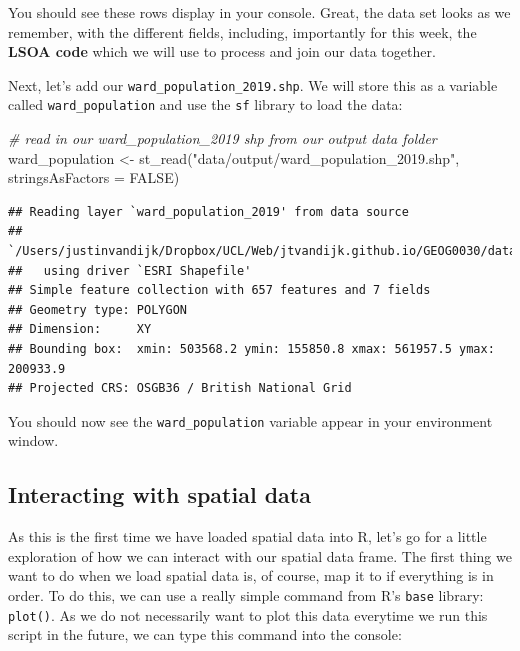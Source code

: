 \documentclass[
]{book}
\newenvironment{Shaded}{\begin{snugshade}}{\end{snugshade}}
\newcommand{\AttributeTok}[1]{\textcolor[rgb]{0.77,0.63,0.00}{#1}}
\newcommand{\CommentTok}[1]{\textcolor[rgb]{0.56,0.35,0.01}{\textit{#1}}}
\newcommand{\ConstantTok}[1]{\textcolor[rgb]{0.00,0.00,0.00}{#1}}
\newcommand{\FunctionTok}[1]{\textcolor[rgb]{0.00,0.00,0.00}{#1}}
\newcommand{\NormalTok}[1]{#1}
\newcommand{\OtherTok}[1]{\textcolor[rgb]{0.56,0.35,0.01}{#1}}
\newcommand{\StringTok}[1]{\textcolor[rgb]{0.31,0.60,0.02}{#1}}
\begin{document}
You should see these rows display in your console. Great, the data set looks as we remember, with the different fields, including, importantly for this week, the \textbf{LSOA code} which we will use to process and join our data together.

Next, let's add our \texttt{ward\_population\_2019.shp}. We will store this as a variable called \texttt{ward\_population} and use the \texttt{sf} library to load the data:

\begin{Shaded}
\begin{Highlighting}[]
\CommentTok{\# read in our ward\_population\_2019 shp from our output data folder}
\NormalTok{ward\_population }\OtherTok{\textless{}{-}} \FunctionTok{st\_read}\NormalTok{(}\StringTok{"data/output/ward\_population\_2019.shp"}\NormalTok{, }\AttributeTok{stringsAsFactors =} \ConstantTok{FALSE}\NormalTok{)}
\end{Highlighting}
\end{Shaded}

\begin{verbatim}
## Reading layer `ward_population_2019' from data source 
##   `/Users/justinvandijk/Dropbox/UCL/Web/jtvandijk.github.io/GEOG0030/data/output/ward_population_2019.shp' 
##   using driver `ESRI Shapefile'
## Simple feature collection with 657 features and 7 fields
## Geometry type: POLYGON
## Dimension:     XY
## Bounding box:  xmin: 503568.2 ymin: 155850.8 xmax: 561957.5 ymax: 200933.9
## Projected CRS: OSGB36 / British National Grid
\end{verbatim}

You should now see the \texttt{ward\_population} variable appear in your environment window.

\hypertarget{interacting-with-spatial-data}{%
\subsection{Interacting with spatial data}\label{interacting-with-spatial-data}}

As this is the first time we have loaded spatial data into R, let's go for a little exploration of how we can interact with our spatial data frame. The first thing we want to do when we load spatial data is, of course, map it to if everything is in order. To do this, we can use a really simple command from R's \texttt{base} library: \texttt{plot()}. As we do not necessarily want to plot this data everytime we run this script in the future, we can type this command into the console:
\end{document}
